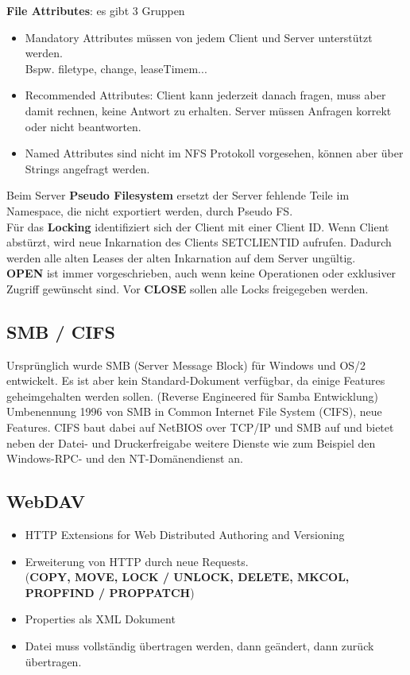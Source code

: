 \documentclass{article} %
\begin{document}
\noindent\textbf{File Attributes}: es gibt 3 Gruppen
	\begin{itemize}
	\item Mandatory Attributes müssen von jedem Client und Server unterstützt werden.\\
	Bspw. filetype, change, leaseTimem...
	\item Recommended Attributes: Client kann jederzeit danach fragen, muss aber damit rechnen, keine Antwort zu erhalten. Server müssen Anfragen korrekt oder nicht beantworten.
	\item Named Attributes sind nicht im NFS Protokoll vorgesehen, können aber über Strings angefragt werden. 
	\end{itemize}

\noindent Beim Server \textbf{Pseudo Filesystem}  ersetzt der Server  fehlende Teile im Namespace, die nicht exportiert werden, durch Pseudo FS.\\

\noindent Für das \textbf{Locking} identifiziert sich der Client mit einer Client ID. Wenn Client abstürzt, wird neue Inkarnation des Clients SETCLIENTID aufrufen. Dadurch werden alle alten Leases der alten Inkarnation auf dem Server ungültig.\\

\noindent\textbf{OPEN} ist immer vorgeschrieben, auch wenn keine Operationen oder exklusiver Zugriff gewünscht sind. Vor \textbf{CLOSE} sollen alle Locks freigegeben werden.
 
\subsection{SMB / CIFS}
Ursprünglich wurde SMB (Server Message Block) für Windows und OS/2 entwickelt. Es ist aber kein Standard-Dokument verfügbar, da einige Features geheimgehalten werden sollen. (Reverse Engineered für Samba Entwicklung)\\
Umbenennung 1996 von SMB in Common Internet File System (CIFS), neue Features. 
CIFS baut dabei auf NetBIOS over TCP/IP und SMB auf und bietet neben der Datei- und Druckerfreigabe weitere Dienste wie zum Beispiel den Windows-RPC- und den NT-Domänendienst an. 
\subsection{WebDAV}
	\begin{itemize}
	\item HTTP Extensions for Web Distributed Authoring and Versioning
	\item Erweiterung von HTTP durch neue Requests. \\
	(\textbf{COPY, MOVE, LOCK / UNLOCK, DELETE, MKCOL, PROPFIND / PROPPATCH})
	\item Properties als XML Dokument 
	\item Datei muss vollständig übertragen werden, dann geändert, dann zurück übertragen. 
	\end{itemize}
\end{document}
